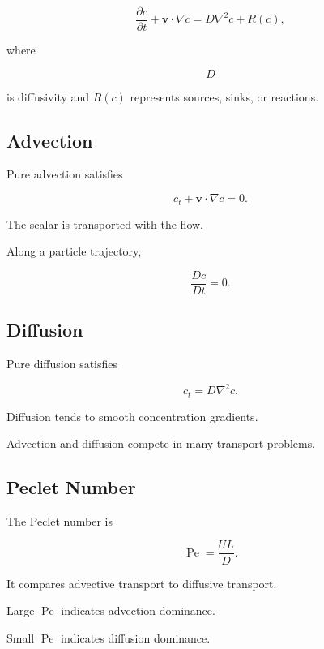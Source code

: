 \[
\boxed{
\frac{\partial c}{\partial t}
+
\mathbf{v}\cdot\nabla c
=
D\nabla^2c
+
R(c),
}
\]

where

\[
D
\]

is diffusivity and \(R(c)\) represents sources, sinks, or reactions.

\subsection{Advection}
\label{subsec:fluid-advection}

Pure advection satisfies

\[
\boxed{
c_t
+
\mathbf{v}\cdot\nabla c
=
0.
}
\]

The scalar is transported with the flow.

Along a particle trajectory,

\[
\boxed{
\frac{Dc}{Dt}=0.
}
\]

\subsection{Diffusion}
\label{subsec:fluid-diffusion}

Pure diffusion satisfies

\[
\boxed{
c_t
=
D\nabla^2c.
}
\]

Diffusion tends to smooth concentration gradients.

Advection and diffusion compete in many transport problems.

\subsection{Peclet Number}
\label{subsec:peclet-number}

The Peclet number is

\[
\boxed{
\operatorname{Pe}
=
\frac{UL}{D}.
}
\]

It compares advective transport to diffusive transport.

Large \(\operatorname{Pe}\) indicates advection dominance.

Small \(\operatorname{Pe}\) indicates diffusion dominance.

